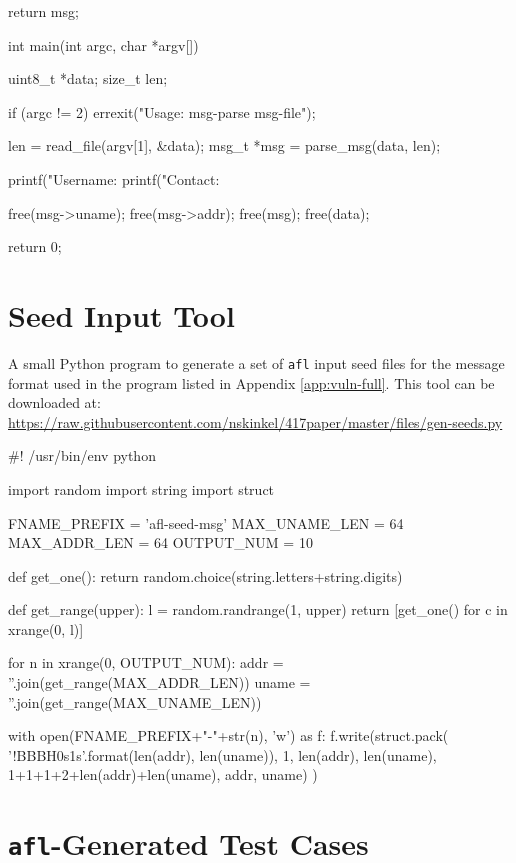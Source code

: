 \begin{appendices}
\begin{TCBlisting}[language={[ANSI]C},basicstyle=\scriptsize,caption={\mylstcaption}]
{    return msg;
}

int
main(int argc, char *argv[]) {
    uint8_t *data;
    size_t len;
    
    if (argc != 2) {
        errexit("Usage: msg-parse msg-file\n");
    }

    len = read_file(argv[1], &data);
    msg_t *msg = parse_msg(data, len);    

    printf("Username: %
    printf("Contact: %

    free(msg->uname);
    free(msg->addr);
    free(msg);
    free(data);

    return 0;
}
\end{TCBlisting}

\chapter{Seed Input Tool}
\label{app:vuln-seed}

A small Python program to generate a set of \texttt{afl} input seed files
for the message format used in the program listed in Appendix \ref{app:vuln-full}.
This tool can be downloaded at: \url{https://raw.githubusercontent.com/nskinkel/417paper/master/files/gen-seeds.py}

\renewcommand\mylstcaption{Caption goes here.}
\begin{TCBlisting}[language=Python,basicstyle=\scriptsize,caption={\mylstcaption}]
#! /usr/bin/env python

import random
import string
import struct


FNAME_PREFIX    = 'afl-seed-msg'
MAX_UNAME_LEN   = 64
MAX_ADDR_LEN    = 64
OUTPUT_NUM      = 10


def get_one():
    return random.choice(string.letters+string.digits)


def get_range(upper):
    l = random.randrange(1, upper)
    return [get_one() for c in xrange(0, l)]    
    

for n in xrange(0, OUTPUT_NUM):
    addr = ''.join(get_range(MAX_ADDR_LEN))
    uname = ''.join(get_range(MAX_UNAME_LEN))

    with open(FNAME_PREFIX+"-"+str(n), 'w') as f:
        f.write(struct.pack(
            '!BBBH{0}s{1}s'.format(len(addr), len(uname)),
            1, len(addr), len(uname),
            1+1+1+2+len(addr)+len(uname), addr, uname)
        )
\end{TCBlisting}

\chapter{\texttt{afl}-Generated Test Cases}
\label{app:test-cases}


\end{appendices}
